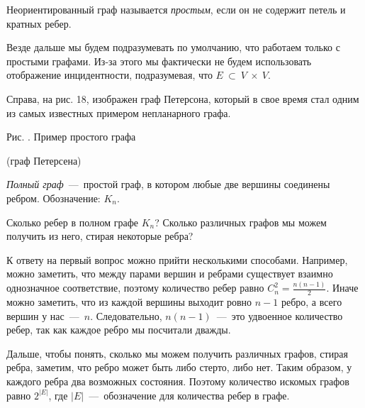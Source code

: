 \begin{paracol}{2}
\begin{definition}
	Неориентированный граф называется \emph{простым}, если он не содержит петель и кратных ребер.
\end{definition}

	Везде дальше мы будем подразумевать по умолчанию, что работаем только с простыми графами. Из-за этого 
	мы фактически не будем использовать отображение инцидентности, подразумевая, что $E~\subset~V~\times~V$.
	
	Справа, на рис. 18, изображен граф Петерсона, который в свое время стал одним из самых известных примером непланарного графа.

\switchcolumn

\begin{center}\end{center}
\begin{center}
	\small Рис. \images. Пример простого графа 
	
	(граф Петерсена)
\end{center}
\end{paracol}

\begin{definition}
	\emph{Полный граф}~---~простой граф, в котором любые две вершины соединены ребром. Обозначение: $K_n$.
\end{definition}

\begin{example}
	Сколько ребер в полном графе $K_n$? Сколько различных графов мы можем получить из него, стирая некоторые ребра?
	
	К ответу на первый вопрос можно прийти несколькими способами. Например, можно заметить, что между парами вершин и 
	ребрами существует взаимно однозначное соответствие, поэтому количество ребер равно $C_n^2 = \frac{n(n-1)}{2}$. 
	Иначе можно заметить, что из каждой вершины выходит ровно $n - 1$ ребро, а всего вершин у нас~---~$n$. Следовательно, 
	$n(n-1)$~---~это удвоенное количество ребер, так как каждое ребро мы посчитали дважды.
	
	Дальше, чтобы понять, сколько мы можем получить различных графов, стирая ребра, заметим, что ребро может быть либо стерто, либо нет. 
	Таким образом, у каждого ребра два возможных состояния. Поэтому количество искомых графов равно $2^{|E|}$, где $|E|$~---~обозначение 
	для количества ребер в графе. 
\end{example}


